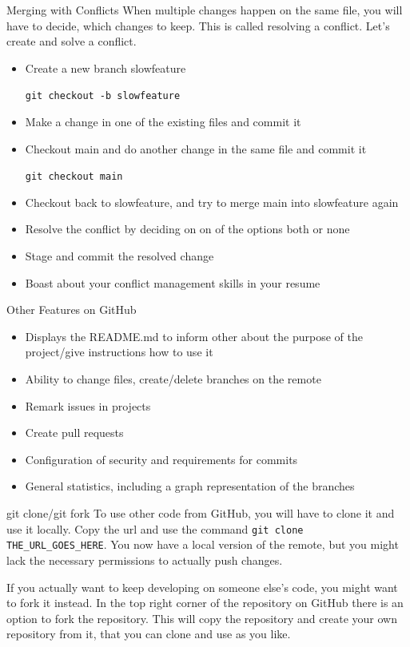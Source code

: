 \documentclass[en]{sdqbeamer}
\begin{document}
\begin{frame}{Merging with Conflicts}
When multiple changes happen on the same file, you will have to decide, which changes to keep. This is called resolving a conflict. Let's create and solve a conflict.
\begin{itemize}
    \item Create a new branch slowfeature

        \lstinline{git checkout -b slowfeature}

    \item Make a change in one of the existing files and commit it
    \item Checkout main and do another change in the same file and commit it
    
        \lstinline{git checkout main}

    \item Checkout back to slowfeature, and try to merge main into slowfeature again
    \item Resolve the conflict by deciding on on of the options both or none
    \item Stage and commit the resolved change
    \item Boast about your conflict management skills in your resume 
\end{itemize}    
\end{frame}

\begin{frame}{Other Features on GitHub}
    \begin{itemize}
        \item Displays the README.md to inform other about the purpose of the project/give instructions how to use it
        \item Ability to change files, create/delete branches on the remote
        \item Remark issues in projects
        \item Create pull requests
        \item Configuration of security and requirements for commits
        \item General statistics, including a graph representation of the branches
    \end{itemize}
    
\end{frame}

\begin{frame}{git clone/git fork}
To use other code from GitHub, you will have to clone it and use it locally. Copy the url and use the command \lstinline{git clone THE_URL_GOES_HERE}. You now have a local version of the remote, but you might lack the necessary permissions to actually push changes.

\vspace{12pt}
If you actually want to keep developing on someone else's code, you might want to fork it instead. In the top right corner of the repository on GitHub there is an option to fork the repository. This will copy the repository and create your own repository from it, that you can clone and use as you like.
    
\end{frame}
\end{document}
